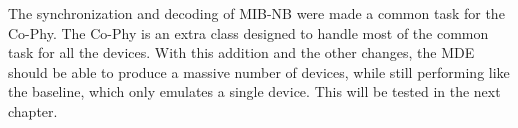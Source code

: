 The synchronization and decoding of MIB-NB were made a common task for the Co-Phy. The Co-Phy is an extra class designed to handle most of the common task for all the devices. With this addition and the other changes, the MDE should be able to produce a massive number of devices, while still performing like the baseline, which only emulates a single device. This will be tested in the next chapter.

